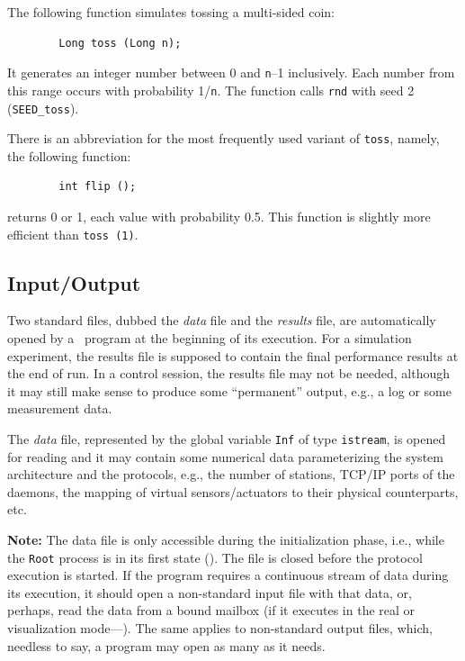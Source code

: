 The following function simulates tossing a multi-sided coin:
\begin{verbatim}
        Long toss (Long n);
\end{verbatim}
It generates an integer number between 0 and {\tt n}--1
inclusively. Each number from this range occurs
with probability 1/{\tt n}. The function calls {\tt rnd} with seed 2
({\tt SEED\_toss}).

There is an abbreviation for the most frequently used variant of {\tt toss},
namely, the following function:
\begin{verbatim}
        int flip ();
\end{verbatim}
returns 0 or 1, each value with probability 0.5.
This function is slightly more efficient than {\tt toss~(1)}.

\subsection{Input/Output}
\label{rm_au_io}

Two standard files, dubbed the {\em data\/} file and the {\em results\/}
file, are automatically opened by a \smurph\ program at the beginning of
its execution.
For a simulation experiment, the results file is supposed to contain the
final performance results at the end of run.
In a control session, the results file may not be needed, although it
may still make sense to produce some ``permanent'' output, e.g., a log or
some measurement data.

The {\em data\/} file, represented by the global variable {\tt Inf}
of type {\tt istream}, is opened for reading and it may contain some
numerical data parameterizing the system architecture and the protocols, e.g.,
the number of stations, TCP/IP ports of the daemons, the mapping of virtual
sensors/actuators to their physical counterparts, etc.

\medskip

\noindent
{\bf Note:}
The data file is only accessible during the initialization phase,
i.e., while the {\tt Root} process is in its first state ().
The file is closed before the protocol execution is started.
If the program requires a continuous stream of data during its execution,
it should open a non-standard input file with that data, or, perhaps, read
the data from a bound mailbox (if it executes in the
real or visualization mode---).
The same applies to non-standard output files, which, needless to say, a
program may open as many as it needs.

